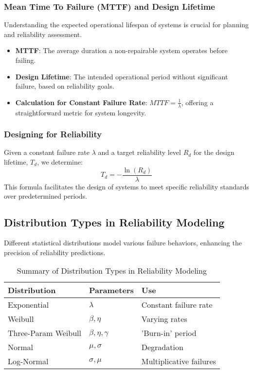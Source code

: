 \subsubsection*{Mean Time To Failure (MTTF) and Design Lifetime}
Understanding the expected operational lifespan of systems is crucial for planning and reliability assessment.
\begin{itemize}
    \item \textbf{MTTF}: The average duration a non-repairable system operates before failing.
    \item \textbf{Design Lifetime}: The intended operational period without significant failure, based on reliability goals.
    \item \textbf{Calculation for Constant Failure Rate}: \( MTTF = \frac{1}{\lambda} \), offering a straightforward metric for system longevity.
\end{itemize}

\subsubsection*{Designing for Reliability}
Given a constant failure rate \( \lambda \) and a target reliability level \( R_d \) for the design lifetime, \( T_d \), we determine:
\[ T_d = -\frac{\ln(R_d)}{\lambda} \]
This formula facilitates the design of systems to meet specific reliability standards over predetermined periods.

\subsection*{Distribution Types in Reliability Modeling}
Different statistical distributions model various failure behaviors, enhancing the precision of reliability predictions.


\begin{table}[ht]
\centering
\caption{Summary of Distribution Types in Reliability Modeling}
\begin{tabular}{@{}lll@{}}
\toprule
\textbf{Distribution} & \textbf{Parameters} & \textbf{Use} \\
\midrule
Exponential & \(\lambda\) & Constant failure rate \\
Weibull & \(\beta, \eta\) & Varying rates \\
Three-Param Weibull & \(\beta, \eta, \gamma\) & 'Burn-in' period \\
Normal & \(\mu, \sigma\) & Degradation \\
Log-Normal & \(\sigma, \mu\) & Multiplicative failures \\
\bottomrule
\end{tabular}
\label{table:distribution_types_no_example}
\end{table}

